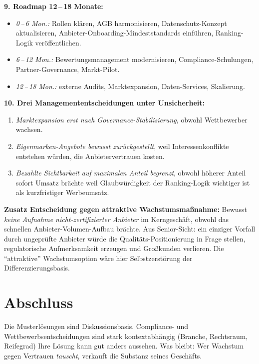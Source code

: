 \documentclass[11pt,a4paper,oneside]{article}
\begin{document}
\begin{loesungbox}
\textbf{9. Roadmap 12\,--\,18 Monate:}
\begin{itemize}
  \item \emph{0\,--\,6 Mon.:} Rollen klären, AGB harmonisieren, Datenschutz-Konzept aktualisieren, Anbieter-Onboarding-Mindeststandards einführen, Ranking-Logik veröffentlichen.
  \item \emph{6\,--\,12 Mon.:} Bewertungsmanagement modernisieren, Compliance-Schulungen, Partner-Governance, Markt-Pilot.
  \item \emph{12\,--\,18 Mon.:} externe Audits, Marktexpansion, Daten-Services, Skalierung.
\end{itemize}

\textbf{10. Drei Managemententscheidungen unter Unsicherheit:}
\begin{enumerate}
  \item \emph{Marktexpansion erst nach Governance-Stabilisierung}, obwohl Wettbewerber wachsen.
  \item \emph{Eigenmarken-Angebote bewusst zurückgestellt}, weil Interessenkonflikte entstehen würden, die Anbietervertrauen kosten.
  \item \emph{Bezahlte Sichtbarkeit auf maximalen Anteil begrenzt}, obwohl höherer Anteil sofort Umsatz brächte \textendash{} weil Glaubwürdigkeit der Ranking-Logik wichtiger ist als kurzfristiger Werbeumsatz.
\end{enumerate}

\smallskip
\textbf{Zusatz \textendash{} Entscheidung gegen attraktive Wachstumsmaßnahme:} Bewusst \emph{keine Aufnahme nicht-zertifizierter Anbieter} im Kerngeschäft, obwohl das schnellen Anbieter-Volumen-Aufbau brächte. Aus Senior-Sicht: ein einziger Vorfall durch ungeprüfte Anbieter würde die Qualitäts-Positionierung in Frage stellen, regulatorische Aufmerksamkeit erzeugen und Großkunden verlieren. Die ``attraktive'' Wachstumsoption wäre hier Selbstzerstörung der Differenzierungsbasis.
\end{loesungbox}

\clearpage

\section*{Abschluss}
\thispagestyle{plain}

\noindent Die Musterlösungen sind Diskussionsbasis. Compliance- und Wettbewerbsentscheidungen sind stark kontextabhängig (Branche, Rechtsraum, Reifegrad) \textendash{} Ihre Lösung kann gut anders aussehen. Was bleibt: Wer Wachstum gegen Vertrauen \emph{tauscht}, verkauft die Substanz seines Geschäfts.
\end{document}
